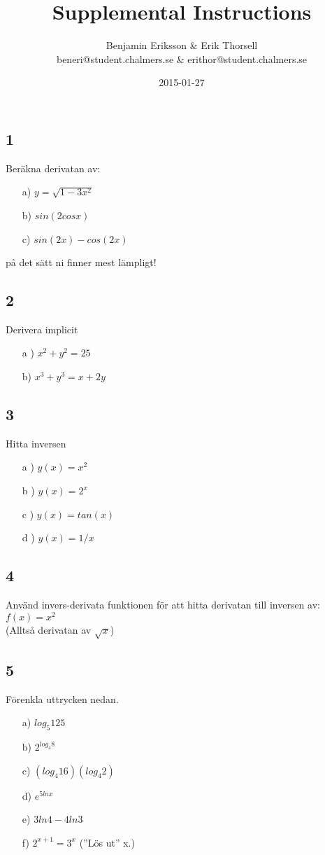\documentclass{article}
\title{Supplemental Instructions}
\author{Benjamin Eriksson \& Erik Thorsell \\ 
		\small{beneri@student.chalmers.se} \&
		\small{erithor@student.chalmers.se}
}
\date{
      2015-01-27
     }
\begin{document}
\maketitle
\subsection*{1}
Beräkna derivatan av:
\begin{itemize}
    \item[a) ] $y = \sqrt{1-3x^2}$
    \item[b) ] $sin(2 cos x)$
    \item[c) ] $sin(2x) - cos(2x)$
\end{itemize}
på det sätt ni finner mest lämpligt!

\subsection*{2}
Derivera implicit
\begin{itemize}
\item[a )] 
$x^2 + y^2 = 25$ \\
\item[b) ]
$x^3 + y^3 = x + 2y$ \\
\end{itemize}


\subsection*{3}
Hitta inversen

\begin{itemize}
\item[a )] $y(x) = x^{2}$
\item[b )] $y(x) = 2^{x}$
\item[c )] $y(x) = tan(x)$
\item[d )] $y(x) = 1/x$
\end{itemize}


\subsection*{4}
Använd invers-derivata funktionen för att hitta derivatan till inversen av: \\
$f(x) = x^2$ \\
(Alltså derivatan av $\sqrt{x}$)

\subsection*{5}
Förenkla uttrycken nedan. \\
\begin{itemize}
    \item[a) ] $log_{5} 125$
    \item[b) ] $2^{log_4 8}$
    \item[c) ] $(log_4 16)(log_4 2)$
    \item[d) ] $e^{5 ln x}$
    \item[e) ] $3 ln 4 - 4 ln 3$
    \item[f) ] $2^{x+1} = 3^x$  {\text (''Lös ut'' x.)}
\end{itemize}
\end{document}
